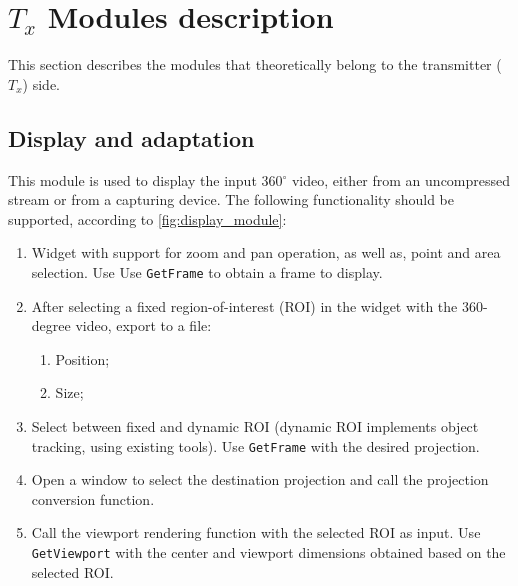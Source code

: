 \documentclass{article}
\begin{document}


\section{$T_x$ Modules description}

This section describes the modules that theoretically belong to the transmitter ($T_x$) side.

\subsection{Display and adaptation}

This module is used to display the input 360$^\circ$ video, either from an uncompressed stream or from a capturing device.
The following functionality should be supported, according to \cref{fig:display_module}:

\begin{enumerate}
    \item Widget with support for zoom and pan operation, as well as, point and area selection. Use Use \texttt{GetFrame} to obtain a frame to display.

    \item  After selecting a fixed region-of-interest (ROI) in the widget with the 360-degree video, export to a file:
    \begin{enumerate}
        \item Position;
        \item Size;
    \end{enumerate}

    \item Select between fixed and dynamic ROI (dynamic ROI implements object tracking, using existing tools). Use \texttt{GetFrame} with the desired projection.

    \item Open a window to select the destination projection and call the projection conversion function.

    \item Call the viewport rendering function with the selected ROI as input. Use \texttt{GetViewport} with the center and viewport dimensions obtained based on the selected ROI.

\end{enumerate}
\end{document}
